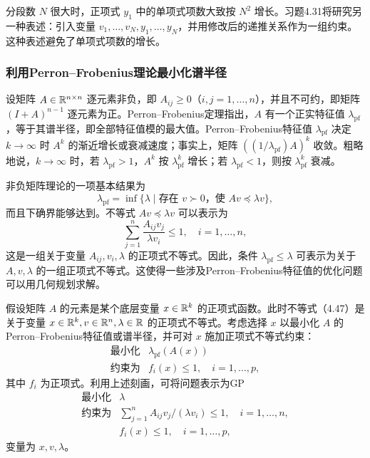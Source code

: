 分段数 $N$ 很大时，正项式 $y_1$ 中的单项式项数大致按 $N^2$ 增长。习题4.31将研究另一种表述：引入变量 $v_1,\ldots,v_N,y_1,\ldots,y_N$，并用修改后的递推关系作为一组约束。这种表述避免了单项式项数的增长。

\subsubsection*{利用Perron--Frobenius理论最小化谱半径}
设矩阵 $A\in\mathbb R^{n\times n}$ 逐元素非负，即 $A_{ij}\ge0$（$i,j=1,\ldots,n$），并且不可约，即矩阵 $(I+A)^{n-1}$ 逐元素为正。Perron--Frobenius定理指出，$A$ 有一个正实特征值 $\lambda_{\mathrm{pf}}$，等于其谱半径，即全部特征值模的最大值。Perron--Frobenius特征值 $\lambda_{\mathrm{pf}}$ 决定 $k\to\infty$ 时 $A^k$ 的渐近增长或衰减速度；事实上，矩阵 $((1/\lambda_{\mathrm{pf}})A)^k$ 收敛。粗略地说，$k\to\infty$ 时，若 $\lambda_{\mathrm{pf}}>1$，$A^k$ 按 $\lambda_{\mathrm{pf}}^k$ 增长；若 $\lambda_{\mathrm{pf}}<1$，则按 $\lambda_{\mathrm{pf}}^k$ 衰减。

非负矩阵理论的一项基本结果为
\[
\lambda_{\mathrm{pf}}=\inf\{\lambda\mid\text{存在 }v\succ0\text{，使 }Av\preceq\lambda v\},
\]
而且下确界能够达到。不等式 $Av\preceq\lambda v$ 可以表示为
\begin{equation}
\sum_{j=1}^n\frac{A_{ij}v_j}{\lambda v_i}\le1,\quad i=1,\ldots,n,\tag{4.47}
\end{equation}
这是一组关于变量 $A_{ij},v_i,\lambda$ 的正项式不等式。因此，条件 $\lambda_{\mathrm{pf}}\le\lambda$ 可表示为关于 $A,v,\lambda$ 的一组正项式不等式。这使得一些涉及Perron--Frobenius特征值的优化问题可以用几何规划求解。

假设矩阵 $A$ 的元素是某个底层变量 $x\in\mathbb R^k$ 的正项式函数。此时不等式（4.47）是关于变量 $x\in\mathbb R^k,v\in\mathbb R^n,\lambda\in\mathbb R$ 的正项式不等式。考虑选择 $x$ 以最小化 $A$ 的Perron--Frobenius特征值或谱半径，并可对 $x$ 施加正项式不等式约束：
\[
\begin{array}{ll}\text{最小化}&\lambda_{\mathrm{pf}}(A(x))\\\text{约束为}&f_i(x)\le1,\quad i=1,\ldots,p,\end{array}
\]
其中 $f_i$ 为正项式。利用上述刻画，可将问题表示为GP
\[
\begin{array}{ll}\text{最小化}&\lambda\\\text{约束为}&\displaystyle\sum_{j=1}^n A_{ij}v_j/(\lambda v_i)\le1,\quad i=1,\ldots,n,\\&f_i(x)\le1,\quad i=1,\ldots,p,\end{array}
\]
变量为 $x,v,\lambda$。

